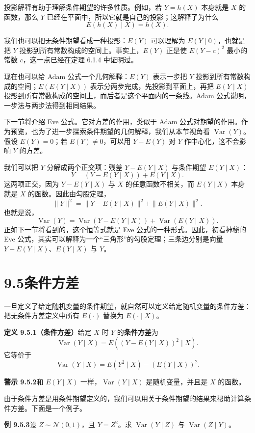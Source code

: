 \documentclass[UTF8,12pt,a4paper,fontset=fandol]{ctexart}
\begin{document}
投影解释有助于理解条件期望的许多性质。例如，若 $Y=h(X)$ 本身就是 $X$ 的函数，那么 $Y$ 已经在平面中，所以它就是自己的投影；这解释了为什么
\[
  E(h(X)\mid X)=h(X).
\]

我们也可以把无条件期望看成一种投影：$E(Y)$ 可以理解为 $E(Y\mid 0)$，也就是把 $Y$ 投影到所有常数构成的空间上。事实上，$E(Y)$ 正是使 $E(Y-c)^2$ 最小的常数 $c$，这一点已经在定理 6.1.4 中证明过。

现在也可以给 Adam 公式一个几何解释：$E(Y)$ 表示一步把 $Y$ 投影到所有常数构成的空间；$E(E(Y\mid X))$ 表示分两步完成，先投影到平面上，再把 $E(Y\mid X)$ 投影到所有常数构成的空间上，而后者是这个平面内的一条线。Adam 公式说明，一步法与两步法得到相同结果。

下一节将介绍 Eve 公式。它对方差的作用，类似于 Adam 公式对期望的作用。作为预览，也为了进一步探索条件期望的几何解释，我们从本节视角看 $\operatorname{Var}(Y)$。假设 $E(Y)=0$；若 $E(Y)\ne0$，可以用 $Y-E(Y)$ 对 $Y$ 作中心化，这不会影响 $Y$ 的方差。

我们可以把 $Y$ 分解成两个正交项：残差 $Y-E(Y\mid X)$ 与条件期望 $E(Y\mid X)$：
\[
  Y=(Y-E(Y\mid X))+E(Y\mid X).
\]
这两项正交，因为 $Y-E(Y\mid X)$ 与 $X$ 的任意函数不相关，而 $E(Y\mid X)$ 本身就是 $X$ 的函数。因此由勾股定理，
\[
  \|Y\|^2=\|Y-E(Y\mid X)\|^2+\|E(Y\mid X)\|^2.
\]
也就是说，
\[
  \operatorname{Var}(Y)
  =\operatorname{Var}(Y-E(Y\mid X))+\operatorname{Var}(E(Y\mid X)).
\]
正如下一节将看到的，这个恒等式就是 Eve 公式的一种形式。因此，初看神秘的 Eve 公式，其实可以解释为一个“三角形”的勾股定理；三条边分别是向量 $Y-E(Y\mid X)$、$E(Y\mid X)$ 与 $Y$。

\section*{9.5\quad 条件方差}

一旦定义了给定随机变量的条件期望，就自然可以定义给定随机变量的条件方差：把无条件方差定义中所有 $E(\cdot)$ 替换为 $E(\cdot\mid X)$。

\noindent\textbf{定义 9.5.1（条件方差）}\quad 给定 $X$ 时 $Y$ 的\textbf{条件方差}为
\[
  \operatorname{Var}(Y\mid X)=E((Y-E(Y\mid X))^2\mid X).
\]
它等价于
\[
  \operatorname{Var}(Y\mid X)=E(Y^2\mid X)-(E(Y\mid X))^2.
\]

\noindent\textbf{警示 9.5.2}\quad 和 $E(Y\mid X)$ 一样，$\operatorname{Var}(Y\mid X)$ 是随机变量，并且是 $X$ 的函数。

由于条件方差是用条件期望定义的，我们可以用关于条件期望的结果来帮助计算条件方差。下面是一个例子。

\noindent\textbf{例 9.5.3}\quad 设 $Z\sim\mathcal N(0,1)$，且 $Y=Z^2$。求 $\operatorname{Var}(Y\mid Z)$ 与 $\operatorname{Var}(Z\mid Y)$。
\end{document}
